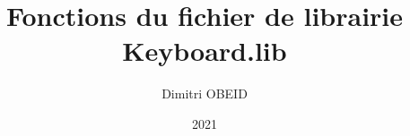 \documentclass[a4paper,10pt]{article}
\title{Fonctions du fichier de librairie Keyboard.lib}
\author{Dimitri OBEID}
\date{2021}
\begin{document}
\maketitle

\begin{abstract}

\end{abstract}

\section{}
\end{document}

